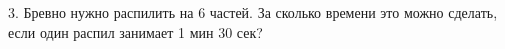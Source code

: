3. Бревно нужно распилить на 6 частей. За сколько времени это можно сделать, если один распил занимает 1 мин 30 сек?\\
